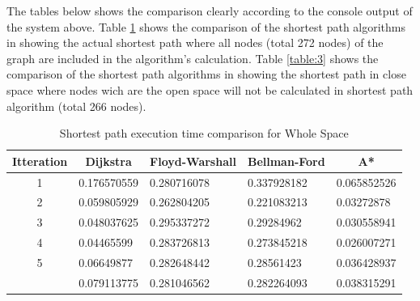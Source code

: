The tables below shows the comparison clearly according to the console output of the system above. Table \ref{table:2} shows the comparison of the shortest path algorithms in showing the actual shortest path where all nodes (total 272 nodes) of the graph are included in the algorithm's calculation. Table \ref{table:3} shows the comparison of the shortest path algorithms in showing the shortest path in close space where nodes wich are the open space will not be calculated in shortest path algorithm (total 266 nodes).


\begin{table}[h!]
	\centering
	\caption{Shortest path execution time comparison for Whole Space}
	\label{table:2}
	\begin{tabular}{|c|l|l|l|l|}
		\hline
		\textbf{Itteration}                                            & \multicolumn{1}{c|}{\textbf{Dijkstra}} & \multicolumn{1}{c|}{\textbf{Floyd-Warshall}} & \multicolumn{1}{c|}{\textbf{Bellman-Ford}} & \multicolumn{1}{c|}{\textbf{A*}} \\ \hline
		1                                                              & 0.176570559                            & 0.280716078                                  & 0.337928182                                & 0.065852526                      \\ \hline
		2                                                              & 0.059805929                            & 0.262804205                                  & 0.221083213                                & 0.03272878                       \\ \hline
		3                                                              & 0.048037625                            & 0.295337272                                  & 0.29284962                                 & 0.030558941                      \\ \hline
		4                                                              & 0.04465599                             & 0.283726813                                  & 0.273845218                                & 0.026007271                      \\ \hline
		5                                                              & 0.06649877                             & 0.282648442                                  & 0.28561423                                 & 0.036428937                      \\ \hline
		\rowcolor[HTML]{9B9B9B} 
		\multicolumn{1}{|l|}{\cellcolor[HTML]{9B9B9B}\textbf{AVERAGE}} & 0.079113775                            & 0.281046562                                  & 0.282264093                                & 0.038315291                      \\ \hline
	\end{tabular}
\end{table}

